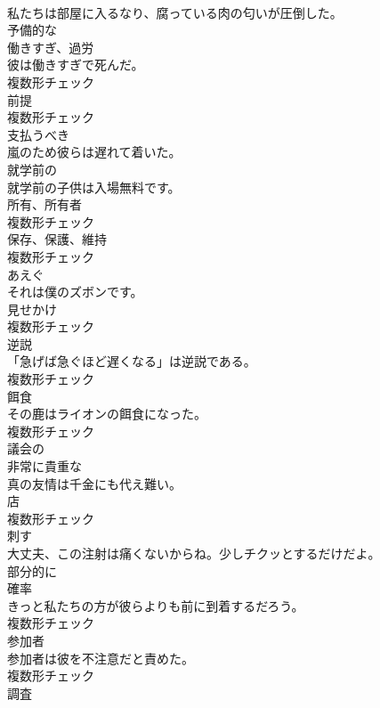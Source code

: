 \documentclass[8pt]{extreport}
\begin{document}
\begin{CJK}{UTF8}{min}
\\	私たちは部屋に入るなり、腐っている肉の匂いが圧倒した。	
\\	[形容詞]	予備的な	
\\	[名詞]	働きすぎ、過労	
\\	彼は働きすぎで死んだ。	
\\	複数形チェック
\\	[名詞]	前提	
\\	複数形チェック
\\	[形容詞]	支払うべき	
\\	嵐のため彼らは遅れて着いた。	
\\	[形容詞]	就学前の	
\\	就学前の子供は入場無料です。	
\\	[名詞]	所有、所有者	
\\	複数形チェック
\\	[名詞]	保存、保護、維持	
\\	複数形チェック
\\	[動詞]	あえぐ	
\\	それは僕のズボンです。	
\\	[名詞]	見せかけ	
\\	複数形チェック
\\	[名詞]	逆説	
\\	「急げば急ぐほど遅くなる」は逆説である。	
\\	複数形チェック
\\	[名詞]	餌食	
\\	その鹿はライオンの餌食になった。	
\\	複数形チェック
\\	[形容詞]	議会の	
\\	[形容詞]	非常に貴重な	
\\	真の友情は千金にも代え難い。	
\\	[名詞]	店	
\\	複数形チェック
\\	[動詞]	刺す	
\\	大丈夫、この注射は痛くないからね。少しチクッとするだけだよ。	
\\	[副詞]	部分的に	
\\	[名詞]	確率	
\\	きっと私たちの方が彼らよりも前に到着するだろう。	
\\	複数形チェック
\\	[名詞]	参加者	
\\	参加者は彼を不注意だと責めた。	
\\	複数形チェック
\\	[名詞]	調査	

\end{CJK}
\end{document}
